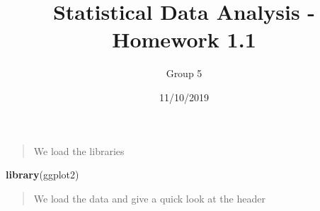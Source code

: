 \documentclass[]{article}
\title{Statistical Data Analysis - Homework 1.1}
\author{Group 5}
\date{11/10/2019}
\newenvironment{Shaded}{\begin{snugshade}}{\end{snugshade}}
\newcommand{\KeywordTok}[1]{\textcolor[rgb]{0.13,0.29,0.53}{\textbf{#1}}}
\newcommand{\NormalTok}[1]{#1}
\begin{document}
\maketitle

\begin{quote}
We load the libraries
\end{quote}

\begin{Shaded}
\begin{Highlighting}[]
\KeywordTok{library}\NormalTok{(ggplot2)}
\end{Highlighting}
\end{Shaded}

\begin{quote}
We load the data and give a quick look at the header
\end{quote}
\end{document}
